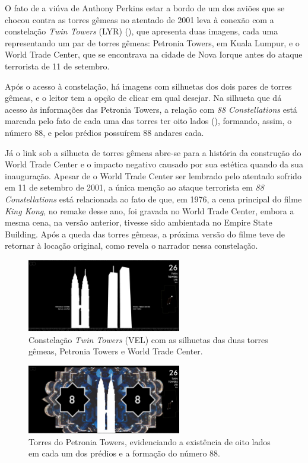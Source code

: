 \documentclass[portuguese]{textolivre}
\begin{document}
O fato de a viúva de Anthony Perkins estar a bordo de um dos aviões que se chocou contra as torres gêmeas no atentado de 2001 leva à conexão com a constelação \emph{Twin Towers} (LYR) (), que apresenta duas imagens, cada uma representando um par de torres gêmeas: Petronia Towers, em Kuala Lumpur, e o World Trade Center, que se encontrava na cidade de Nova Iorque antes do ataque terrorista de 11 de setembro. 

Após o acesso à constelação, há imagens com silhuetas dos dois pares de torres gêmeas, e o leitor tem a opção de clicar em qual desejar. Na silhueta que dá acesso às informações das Petronia Towers, a relação com \emph{88 Constellations} está marcada pelo fato de cada uma das torres ter oito lados (), formando, assim, o número 88, e pelos prédios possuírem 88 andares cada. 

Já o link sob a silhueta de torres gêmeas abre-se para a história da construção do World Trade Center e o impacto negativo causado por sua estética quando da sua inauguração. Apesar de o World Trade Center ser lembrado pelo atentado sofrido em 11 de setembro de 2001, a única menção ao ataque terrorista em \emph{88 Constellations} está relacionada ao fato de que, em 1976, a cena principal do filme \emph{King Kong}, no remake desse ano, foi gravada no World Trade Center, embora a mesma cena, na versão anterior, tivesse sido ambientada no Empire State Building. Após a queda das torres gêmeas, a próxima versão do filme teve de retornar à locação original, como revela o narrador nessa constelação.

\begin{figure}[htbp]
 \centering
 \includegraphics[width=0.6\textwidth]{Fig10[1].jpg}
 \caption{Constelação \emph{Twin Towers} (VEL) com as silhuetas das duas torres gêmeas, Petronia Towers e World Trade Center.}
 \label{fig10}
\end{figure}

\begin{figure}[htbp]
 \centering
 \includegraphics[width=0.6\textwidth]{Fig11[1].jpg}
 \caption{Torres do Petronia Towers, evidenciando a existência de oito lados em cada um dos prédios e a formação do número 88.}
 \label{fig11}
\end{figure}
\end{document}

